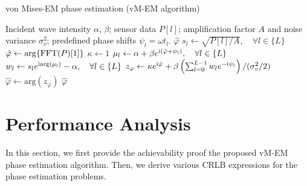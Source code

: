 \documentclass[journal,twocolumn]{IEEEtran}
\theoremstyle{nonumberplain}
\def \arg {\text{arg}}
\def \ri {{\rm i}}
\begin{document}
    \begin{algorithm}[t] 
        \caption{von Mises-EM phase estimation (vM-EM algorithm)} \label{alg:vM-EM}
        \begin{algorithmic}[1]
            \REQUIRE Incident wave intensity $\alpha$, $\beta$; sensor data $P[l]$; amplification factor $A$ and noise variance $\sigma_v^2$; predefined phase shifts $\psi_l=\omega t_l$.
            \ENSURE $\hat{\varphi}$
            \STATE $s_l \leftarrow \sqrt{P[l]/A}, \quad \forall l\in \{L\}$
            \STATE $\hat{\varphi} \leftarrow \arg\{{\rm FFT}(P)[1]\}$
            \STATE $\kappa \leftarrow 1$
                \STATE $\mu_l \leftarrow \alpha + \beta e^{{\ri} (\hat{\varphi}+\psi_l)}, \quad \forall l\in \{L\}$
                \STATE $w_l \leftarrow s_l e^{{\ri} \arg(\mu_l)} - \alpha, \quad \forall l\in \{L\}$
                \STATE $z_\varphi \leftarrow \kappa e^{{\ri} \hat{\varphi}} + \beta \left( \sum_{l=0}^{L-1}{w_l e^{-{\ri} \psi_l}}\right) / (\sigma_v^2/2)$
                \STATE $\hat{\varphi} \leftarrow \arg(z_\varphi)$
            \ENDWHILE
            \RETURN $\hat{\varphi}$
        \end{algorithmic}
    \end{algorithm}
    
\section{Performance Analysis}
\label{Performance Analysis}
    In this section, we first provide the achievability proof the proposed vM-EM phase estimation algorithm. Then, we derive various CRLB expressions for the phase estimation problems. 
\end{document}
